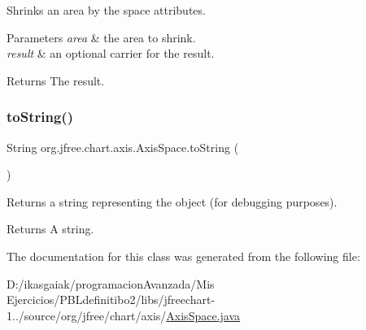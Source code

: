 Shrinks an area by the space attributes.


\begin{DoxyParams}{Parameters}
{\em area} & the area to shrink. \\
\hline
{\em result} & an optional carrier for the result.\\
\hline
\end{DoxyParams}
\begin{DoxyReturn}{Returns}
The result. 
\end{DoxyReturn}
\mbox{\label{classorg_1_1jfree_1_1chart_1_1axis_1_1_axis_space_a0016d6845fc167409ae7ec84b294479e}} 
\subsubsection{\texorpdfstring{to\+String()}{toString()}}
{\footnotesize\ttfamily String org.\+jfree.\+chart.\+axis.\+Axis\+Space.\+to\+String (\begin{DoxyParamCaption}{ }\end{DoxyParamCaption})}

Returns a string representing the object (for debugging purposes).

\begin{DoxyReturn}{Returns}
A string. 
\end{DoxyReturn}


The documentation for this class was generated from the following file\+:\begin{DoxyCompactItemize}
\item 
D\+:/ikasgaiak/programacion\+Avanzada/\+Mis Ejercicios/\+P\+B\+Ldefinitibo2/libs/jfreechart-\/1../source/org/jfree/chart/axis/\mbox{\hyperlink{_axis_space_8java}{Axis\+Space.\+java}}\end{DoxyCompactItemize}
